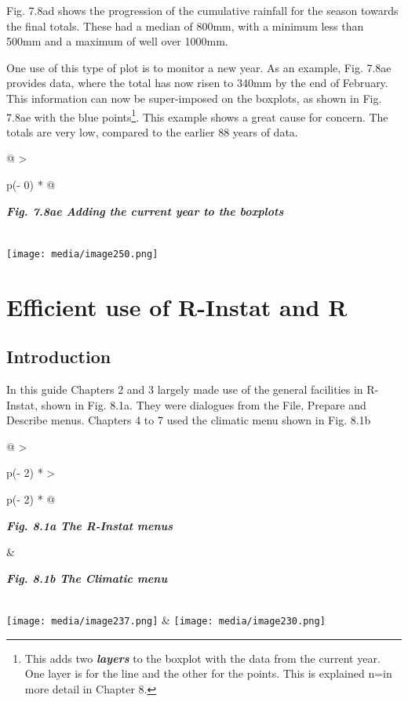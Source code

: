 \documentclass[
  letterpaper,
  DIV=11,
  numbers=noendperiod]{scrreprt}
\begin{document}
Fig. 7.8ad shows the progression of the cumulative rainfall for the
season towards the final totals. These had a median of 800mm, with a
minimum less than 500mm and a maximum of well over 1000mm.

One use of this type of plot is to monitor a new year. As an example,
Fig. 7.8ae provides data, where the total has now risen to 340mm by the
end of February. This information can now be super-imposed on the
boxplots, as shown in Fig. 7.8ae with the blue points\footnote{This adds
  two \textbf{\emph{layers}} to the boxplot with the data from the
  current year. One layer is for the line and the other for the points.
  This is explained n=in more detail in Chapter 8.}. This example shows
a great cause for concern. The totals are very low, compared to the
earlier 88 years of data.

\begin{longtable}[]{@{}
  >{\raggedright\arraybackslash}p{(\columnwidth - 0\tabcolsep) * }@{}}
\toprule\noalign{}
\begin{minipage}[b]{\linewidth}\raggedright
\textbf{\emph{Fig. 7.8ae Adding the current year to the boxplots}}
\end{minipage} \\
\midrule\noalign{}
\endhead
\bottomrule\noalign{}
\endlastfoot
\texttt{[image: media/image250.png]} \\
\end{longtable}


\chapter{Efficient use of R-Instat and
R}\label{efficient-use-of-r-instat-and-r}

\section{Introduction}\label{introduction-6}

In this guide Chapters 2 and 3 largely made use of the general
facilities in R-Instat, shown in Fig. 8.1a. They were dialogues from the
File, Prepare and Describe menus. Chapters 4 to 7 used the climatic menu
shown in Fig. 8.1b

\begin{longtable}[]{@{}
  >{\raggedright\arraybackslash}p{(\columnwidth - 2\tabcolsep) * }
  >{\raggedright\arraybackslash}p{(\columnwidth - 2\tabcolsep) * }@{}}
\toprule\noalign{}
\begin{minipage}[b]{\linewidth}\raggedright
\textbf{\emph{Fig. 8.1a The R-Instat menus}}
\end{minipage} & \begin{minipage}[b]{\linewidth}\raggedright
\textbf{\emph{Fig. 8.1b The Climatic menu}}
\end{minipage} \\
\midrule\noalign{}
\endhead
\bottomrule\noalign{}
\endlastfoot
\texttt{[image: media/image237.png]} &
\texttt{[image: media/image230.png]} \\
\end{longtable}
\end{document}
